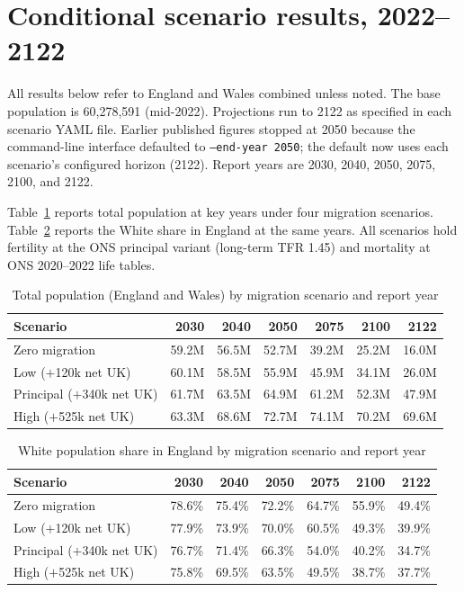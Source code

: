 \documentclass[12pt,a4paper]{article}
\begin{document}
\section{Conditional scenario results, 2022--2122}

All results below refer to England and Wales combined unless noted. The base population is
60,278,591 (mid-2022). Projections run to 2122 as specified in each scenario YAML file.
Earlier published figures stopped at 2050 because the command-line interface defaulted to
\texttt{--end-year 2050}; the default now uses each scenario's configured horizon (2122).
Report years are 2030, 2040, 2050, 2075, 2100, and 2122.

Table~\ref{tab:scenarios} reports total population at key years under four migration
scenarios. Table~\ref{tab:white_share} reports the White share in England at the same years.
All scenarios hold fertility at the ONS principal variant (long-term TFR 1.45) and mortality
at ONS 2020--2022 life tables.

\begin{table}[H]
\centering
\caption{Total population (England and Wales) by migration scenario and report year}
\label{tab:scenarios}
\small
\begin{tabular}{lrrrrrr}
\toprule
\textbf{Scenario} & \textbf{2030} & \textbf{2040} & \textbf{2050} & \textbf{2075} & \textbf{2100} & \textbf{2122} \\
\midrule
Zero migration & 59.2M & 56.5M & 52.7M & 39.2M & 25.2M & 16.0M \\
Low ($+$120k net UK) & 60.1M & 58.5M & 55.9M & 45.9M & 34.1M & 26.0M \\
Principal ($+$340k net UK) & 61.7M & 63.5M & 64.9M & 61.2M & 52.3M & 47.9M \\
High ($+$525k net UK) & 63.3M & 68.6M & 72.7M & 74.1M & 70.2M & 69.6M \\
\bottomrule
\end{tabular}
\end{table}

\begin{table}[H]
\centering
\caption{White population share in England by migration scenario and report year}
\label{tab:white_share}
\small
\begin{tabular}{lrrrrrr}
\toprule
\textbf{Scenario} & \textbf{2030} & \textbf{2040} & \textbf{2050} & \textbf{2075} & \textbf{2100} & \textbf{2122} \\
\midrule
Zero migration & 78.6\% & 75.4\% & 72.2\% & 64.7\% & 55.9\% & 49.4\% \\
Low ($+$120k net UK) & 77.9\% & 73.9\% & 70.0\% & 60.5\% & 49.3\% & 39.9\% \\
Principal ($+$340k net UK) & 76.7\% & 71.4\% & 66.3\% & 54.0\% & 40.2\% & 34.7\% \\
High ($+$525k net UK) & 75.8\% & 69.5\% & 63.5\% & 49.5\% & 38.7\% & 37.7\% \\
\bottomrule
\end{tabular}
\end{table}
\end{document}
